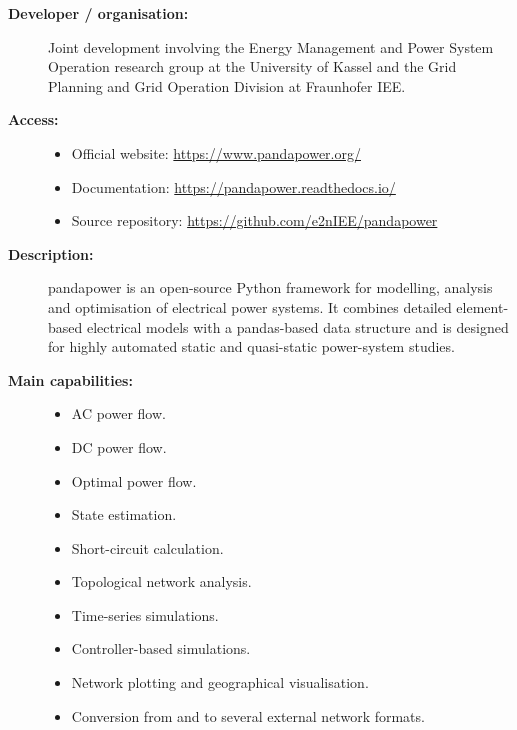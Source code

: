 \begin{description}

    \item[\textbf{Developer / organisation:}]
    Joint development involving the Energy Management and Power System
    Operation research group at the University of Kassel and the Grid
    Planning and Grid Operation Division at Fraunhofer IEE.

    \item[\textbf{Access:}] \hfill
    \begin{itemize}
        \item Official website:
        \url{https://www.pandapower.org/}

        \item Documentation:
        \url{https://pandapower.readthedocs.io/}

        \item Source repository:
        \url{https://github.com/e2nIEE/pandapower}
    \end{itemize}

    \item[\textbf{Description:}]
    pandapower is an open-source Python framework for modelling, analysis
    and optimisation of electrical power systems. It combines detailed
    element-based electrical models with a pandas-based data structure and
    is designed for highly automated static and quasi-static power-system
    studies.

    \item[\textbf{Main capabilities:}] \hfill
    \begin{itemize}
        \item AC power flow.
        \item DC power flow.
        \item Optimal power flow.
        \item State estimation.
        \item Short-circuit calculation.
        \item Topological network analysis.
        \item Time-series simulations.
        \item Controller-based simulations.
        \item Network plotting and geographical visualisation.
        \item Conversion from and to several external network formats.
    \end{itemize}


\end{description}
